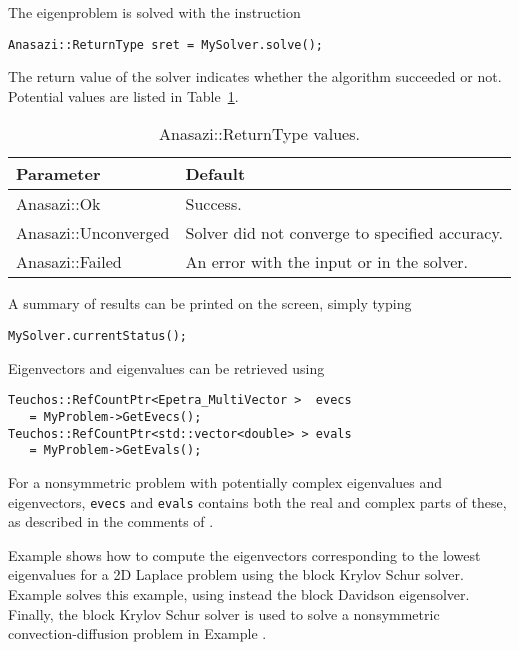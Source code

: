 The eigenproblem is solved with the instruction
\begin{verbatim}
Anasazi::ReturnType sret = MySolver.solve();
\end{verbatim}
The return value of the solver indicates whether the algorithm
succeeded or not. Potential values are listed in
Table~\ref{tab:anasazi:rt}.

\begin{table}
\begin{center}
\begin{tabular}{| p{4cm} l |}
\hline
Parameter & Default \\
\hline
Anasazi::Ok          & Success. \\
Anasazi::Unconverged & Solver did not converge to specified accuracy. \\
Anasazi::Failed      & An error with the input or in the solver. \\
\hline
\end{tabular}
\caption{Anasazi::ReturnType values.}
\label{tab:anasazi:rt}
\end{center}
\end{table}

A summary of results can be printed on the screen, simply typing
\begin{verbatim}
MySolver.currentStatus();
\end{verbatim}
Eigenvectors and eigenvalues can be retrieved using
\begin{verbatim}
Teuchos::RefCountPtr<Epetra_MultiVector >  evecs 
   = MyProblem->GetEvecs();
Teuchos::RefCountPtr<std::vector<double> > evals 
   = MyProblem->GetEvals();
\end{verbatim}
For a nonsymmetric problem with potentially complex eigenvalues and
eigenvectors, \verb!evecs! and \verb!evals! contains both the real and
complex parts of these, as described in the comments of
.

Example  shows how to compute the eigenvectors
corresponding to the lowest eigenvalues for a 2D Laplace problem using
the block Krylov Schur solver.  Example 
solves this example, using instead the block Davidson eigensolver.
Finally, the block Krylov Schur solver is used to solve a nonsymmetric
convection-diffusion problem in Example .



